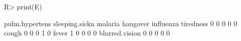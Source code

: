 \begin{Schunk}
% --begin: "comp.e"
\begin{Sinput}
R> print(E)
\end{Sinput}
\begin{Soutput}
               pulm.hypertens sleeping.sickn malaria hangover influenza
tiredness                   0              0       0        0         0
cough                       0              0       0        1         0
fever                       1              0       0        0         0
blurred.vision              0              0       0        0         0
\end{Soutput}
%
% --end: "comp.e"
\end{Schunk}
